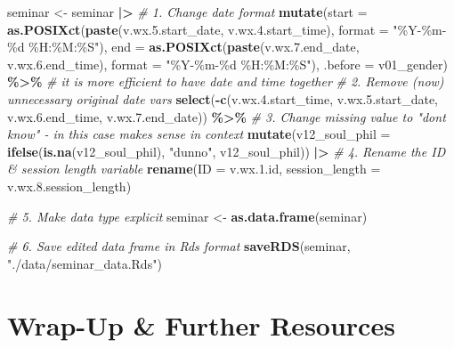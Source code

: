 \documentclass[
]{book}
\newenvironment{Shaded}{\begin{snugshade}}{\end{snugshade}}
\newcommand{\AttributeTok}[1]{\textcolor[rgb]{0.13,0.29,0.53}{#1}}
\newcommand{\CommentTok}[1]{\textcolor[rgb]{0.56,0.35,0.01}{\textit{#1}}}
\newcommand{\FloatTok}[1]{\textcolor[rgb]{0.00,0.00,0.81}{#1}}
\newcommand{\FunctionTok}[1]{\textcolor[rgb]{0.13,0.29,0.53}{\textbf{#1}}}
\newcommand{\NormalTok}[1]{#1}
\newcommand{\OtherTok}[1]{\textcolor[rgb]{0.56,0.35,0.01}{#1}}
\newcommand{\SpecialCharTok}[1]{\textcolor[rgb]{0.81,0.36,0.00}{\textbf{#1}}}
\newcommand{\StringTok}[1]{\textcolor[rgb]{0.31,0.60,0.02}{#1}}
\begin{document}
\begin{Shaded}
\begin{Highlighting}[]
\NormalTok{seminar }\OtherTok{\textless{}{-}}\NormalTok{ seminar }\SpecialCharTok{|\textgreater{}} 
  \CommentTok{\# 1. Change date format }
  \FunctionTok{mutate}\NormalTok{(}\AttributeTok{start =} \FunctionTok{as.POSIXct}\NormalTok{(}\FunctionTok{paste}\NormalTok{(v.wx.}\FloatTok{5.}\NormalTok{start\_date, v.wx.}\FloatTok{4.}\NormalTok{start\_time), }\AttributeTok{format =} \StringTok{"\%Y{-}\%m{-}\%d \%H:\%M:\%S"}\NormalTok{),}
         \AttributeTok{end =} \FunctionTok{as.POSIXct}\NormalTok{(}\FunctionTok{paste}\NormalTok{(v.wx.}\FloatTok{7.}\NormalTok{end\_date, v.wx.}\FloatTok{6.}\NormalTok{end\_time), }\AttributeTok{format =} \StringTok{"\%Y{-}\%m{-}\%d \%H:\%M:\%S"}\NormalTok{), }
         \AttributeTok{.before =}\NormalTok{ v01\_gender) }\SpecialCharTok{\%\textgreater{}\%} \CommentTok{\# it is more efficient to have date and time together}
  \CommentTok{\# 2. Remove (now) unnecessary original date vars }
  \FunctionTok{select}\NormalTok{(}\SpecialCharTok{{-}}\FunctionTok{c}\NormalTok{(v.wx.}\FloatTok{4.}\NormalTok{start\_time, v.wx.}\FloatTok{5.}\NormalTok{start\_date, v.wx.}\FloatTok{6.}\NormalTok{end\_time, v.wx.}\FloatTok{7.}\NormalTok{end\_date)) }\SpecialCharTok{\%\textgreater{}\%} 
  \CommentTok{\# 3. Change missing value to "don\textquotesingle{}t know" {-} in this case makes sense in context}
  \FunctionTok{mutate}\NormalTok{(}\AttributeTok{v12\_soul\_phil =} \FunctionTok{ifelse}\NormalTok{(}\FunctionTok{is.na}\NormalTok{(v12\_soul\_phil), }\StringTok{"dunno"}\NormalTok{, v12\_soul\_phil)) }\SpecialCharTok{|\textgreater{}} 
  \CommentTok{\# 4. Rename the ID \& session length variable}
  \FunctionTok{rename}\NormalTok{(}\AttributeTok{ID =}\NormalTok{ v.wx.}\FloatTok{1.}\NormalTok{id,}
         \AttributeTok{session\_length =}\NormalTok{ v.wx.}\FloatTok{8.}\NormalTok{session\_length)}

\CommentTok{\# 5. Make data type explicit}
\NormalTok{seminar }\OtherTok{\textless{}{-}} \FunctionTok{as.data.frame}\NormalTok{(seminar)}

\CommentTok{\# 6. Save edited data frame in Rds format}
\FunctionTok{saveRDS}\NormalTok{(seminar, }\StringTok{"./data/seminar\_data.Rds"}\NormalTok{)}
\end{Highlighting}
\end{Shaded}

\section*{Wrap-Up \& Further Resources}\label{wrap-up-further-resources-4}
\end{document}
